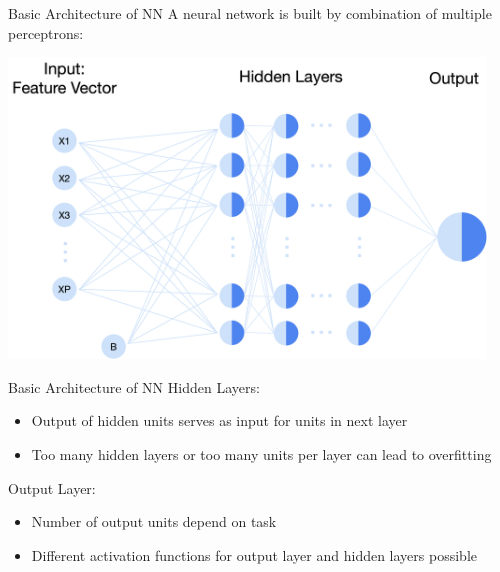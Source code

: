 \documentclass[11pt,compress,t,notes=noshow, xcolor=table]{beamer}
\begin{document}
\begin{vbframe}{Basic Architecture of NN}
\small A neural network is built by combination of multiple perceptrons:

\vspace{0.5cm}
\includegraphics[width = 0.95\textwidth]{figure_man/nutshell-nn-basic-architecture.png}    
\end{vbframe}

\begin{vbframe}{Basic Architecture of NN}
Hidden Layers: 
     \begin{itemize}
         \item  Output of hidden units serves as input for units in next layer
         \item Too many hidden layers or too many units per layer can lead to overfitting
     \end{itemize}
Output Layer:
    \begin{itemize}
        \item Number of output units depend on task
        \item Different activation functions for output layer and hidden layers possible
    \end{itemize}

\end{vbframe}
\end{document}
